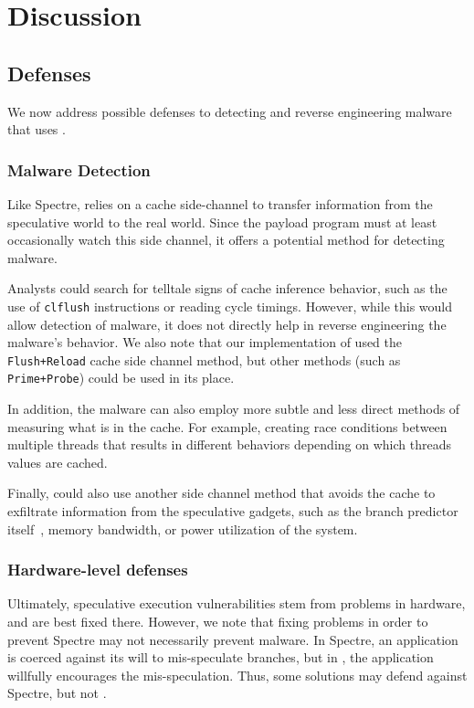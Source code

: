 
\section{Discussion}

\subsection{Defenses}
We now address possible defenses to detecting and reverse engineering malware that uses
\speculake. 

\subsubsection{Malware Detection}
\label{subsubsec:malware}
Like Spectre, \speculake relies on a cache side-channel to transfer
information from the speculative world to the real world. Since the payload
program must at least occasionally watch this side channel, it offers a
potential method for detecting \speculake malware.

Analysts could search for telltale signs of cache inference behavior, such as
the use of \texttt{clflush} instructions or reading cycle timings. However,
while this would allow detection of \speculake malware, it does not directly
help in reverse engineering the malware's behavior. We also note that our
implementation of \speculake used the \texttt{Flush+Reload} cache side channel
method, but other methods (such as \texttt{Prime+Probe}) could be used in its
place.


In addition, the malware can also employ more subtle and less direct methods
of measuring what is in the cache. For example, creating race conditions between
multiple threads that results in different behaviors depending on which threads
values are cached.

Finally, \speculake could also use another side channel method that
avoids the cache
to exfiltrate information from the speculative gadgets, such as the branch
predictor itself~\cite{evtyushkin2018branchscope}, memory bandwidth, or power
utilization of the system.



\subsubsection{Hardware-level defenses}
Ultimately, speculative execution vulnerabilities stem from problems in
hardware, and are best fixed there. However, we note that fixing problems in
order to prevent Spectre may not necessarily prevent \speculake malware. In Spectre, an application is
coerced against its will to mis-speculate branches, but in \speculake, the
application willfully encourages the mis-speculation. Thus, some solutions may
defend against Spectre, but not \speculake.


